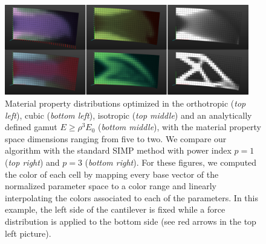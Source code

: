 \begin{figure}
	\centering
	\includegraphics[width=0.95\textwidth]{images/cantilever.png}
	\caption{Material property distributions optimized in the orthotropic (\emph{top left}), cubic (\emph{bottom left}), isotropic (\emph{top middle}) and an analytically defined gamut $E \geq \rho^3 E_0$ (\emph{bottom middle}), with the material property space dimensions ranging from five to two. 
		We compare our algorithm with the standard SIMP method with power index $p=1$ (\emph{top right}) and $p=3$ (\emph{bottom right}). For these figures, we computed the color of each cell by mapping every base vector of the normalized parameter space to a color range and linearly interpolating the colors associated to each of the parameters.
		In this example, the left side of the cantilever is fixed while a force distribution is applied to the bottom side (see red arrows in the top left picture).}
	\label{fig:defo_cvg}
\end{figure}

